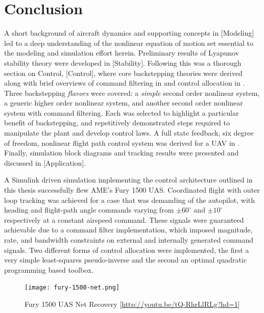 \documentclass[12pt]{ucthesis}
\begin{document}
\chapter{Conclusion}
\label{chp: conclusion}
%
A short background of aircraft dynamics and supporting concepts in [Modeling] led to a deep understanding of the nonlinear equation of motion set essential to the modeling and simulation effort herein. Preliminary results of Lyapunov stability theory were developed in [Stability]. Following this was a thorough section on Control, [Control], where core backstepping theories were derived along with brief overviews of command filtering in  and control allocation in . Three backstepping \textit{flavors} were covered: a \textit{simple} second order nonlinear system, a generic higher order nonlinear system, and another second order nonlinear system with command filtering. Each was selected to highlight a particular benefit of backstepping, and repetitively demonstrated steps required to manipulate the plant and develop control laws. A full state feedback, six degree of freedom, nonlinear flight path control system was derived for a UAV in . Finally, simulation block diagrams and tracking results were presented and discussed in [Application].

A Simulink driven simulation implementing the control architecture outlined in this thesis successfully flew AME's Fury 1500 UAS. Coordinated flight with outer loop tracking was achieved for a case that was demanding of the autopilot, with heading and flight-path angle commands varying from $\pm 60^{\circ}$ and $\pm 10^{\circ}$ respectively at a constant airspeed command. These signals were guaranteed achievable due to a command filter implementation, which imposed magnitude, rate, and bandwidth constraints on external and internally generated command signals. Two different forms of control allocation were implemented, the first a very simple least-squares pseudo-inverse and the second an optimal quadratic programming based toolbox. 

\begin{figure}[htb]
	\centering
	\texttt{[image: fury-1500-net.png]}
	\caption{Fury 1500 UAS Net Recovery [\href{http://youtu.be/tQ-RhrLlRLg?hd=1}{http://youtu.be/tQ-RhrLlRLg?hd=1}]}
	\label{fig: fury_1500_net}
\end{figure}
\end{document}
